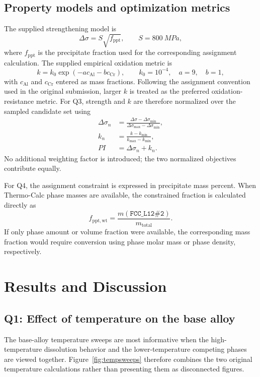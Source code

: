 \documentclass[11pt]{article}
\newcommand{\volfrac}{f_{\mathrm{ppt}}}
\newcommand{\phase}[1]{\texttt{#1}}
\begin{document}
\subsection{Property models and optimization metrics}
The supplied strengthening model is
\begin{equation}
\Delta\sigma = S\sqrt{\volfrac}, \qquad S=\SI{800}{MPa},
\label{eq:strength}
\end{equation}
where $\volfrac$ is the precipitate fraction used for the corresponding assignment calculation. The supplied empirical oxidation metric is
\begin{equation}
k = k_0\exp\left(-a c_{\mathrm{Al}}-b c_{\mathrm{Cr}}\right),
\qquad k_0=10^{-4},\quad a=9,\quad b=1,
\label{eq:k}
\end{equation}
with $c_{\mathrm{Al}}$ and $c_{\mathrm{Cr}}$ entered as mass fractions. Following the assignment convention used in the original submission, larger $k$ is treated as the preferred oxidation-resistance metric. For Q3, strength and $k$ are therefore normalized over the sampled candidate set using
\begin{align}
\Delta\sigma_n &= \frac{\Delta\sigma-\Delta\sigma_{\min}}{\Delta\sigma_{\max}-\Delta\sigma_{\min}}, \\
k_n &= \frac{k-k_{\min}}{k_{\max}-k_{\min}}, \\
PI &= \Delta\sigma_n+k_n.
\end{align}
No additional weighting factor is introduced; the two normalized objectives contribute equally.

For Q4, the assignment constraint is expressed in precipitate mass percent. When Thermo-Calc phase masses are available, the constrained fraction is calculated directly as
\begin{equation}
f_{\mathrm{ppt,wt}}=\frac{m(\phase{FCC\_L12\#2})}{m_{\mathrm{total}}}.
\label{eq:massfraction}
\end{equation}
If only phase amount or volume fraction were available, the corresponding mass fraction would require conversion using phase molar mass or phase density, respectively.

\section{Results and Discussion}
\subsection{Q1: Effect of temperature on the base alloy}
The base-alloy temperature sweeps are most informative when the high-temperature dissolution behavior and the lower-temperature competing phases are viewed together. Figure~\ref{fig:tempsweeps} therefore combines the two original temperature calculations rather than presenting them as disconnected figures.
\end{document}
